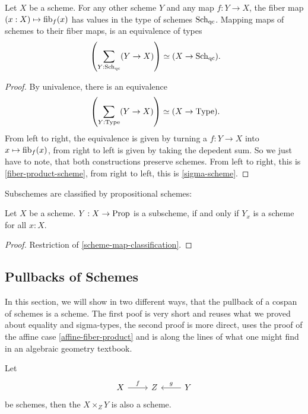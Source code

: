 \begin{corollary}
  \label{scheme-map-classification}
  Let $X$ be a scheme.
  For any other scheme $Y$ and any map $f:Y\to X$,
  the fiber map
  $(x:X)\mapsto \mathrm{fib}_f(x)$
  has values in the type of schemes $\operatorname{\mathrm{Sch}_{qc}}$.
  Mapping maps of schemes to their fiber maps,
  is an equivalence of types
  \[ \left(\sum_{Y:\Sch}(Y\to X)\right)\simeq (X\to \Sch)\rlap{.}\]
\end{corollary}

\begin{proof}
  By univalence, there is an equivalence
  \[ \left(\sum_{Y:\Type}(Y\to X)\right)\simeq (X\to \Type)\rlap{.} \]
  From left to right, the equivalence is given by turning a $f:Y\to X$ into $x\mapsto \mathrm{fib}_f(x)$,
  from right to left is given by taking the depedent sum.
  So we just have to note, that both constructions preserve schemes.
  From left to right, this is \cref{fiber-product-scheme}, from right to left,
  this is \cref{sigma-scheme}.
\end{proof}

Subschemes are classified by propositional schemes:

\begin{corollary}
  Let $X$ be a scheme.
  $Y:X\to\mathrm{Prop}$ is a subscheme,
  if and only if $Y_x$ is a scheme for all $x:X$.
\end{corollary}

\begin{proof}
  Restriction of \cref{scheme-map-classification}.
\end{proof}

\subsection{Pullbacks of Schemes}

In this section, we will show in two different ways,
that the pullback of a cospan of schemes is a scheme.
The first poof is very short and reuses what we proved about equality and sigma-types,
the second proof is more direct, uses the proof of the affine case \cref{affine-fiber-product}
and is along the lines of what one might find in an algebraic geometry textbook.

\begin{theorem}%
  \label{fiber-product-scheme}
  Let
  \[
    \begin{tikzcd}
      X\ar[r,"f"] & Z & Y\ar[l,swap,"g"]
    \end{tikzcd}
  \]
  be schemes, then the  $X\times_Z Y$ is also a scheme.
\end{theorem}

